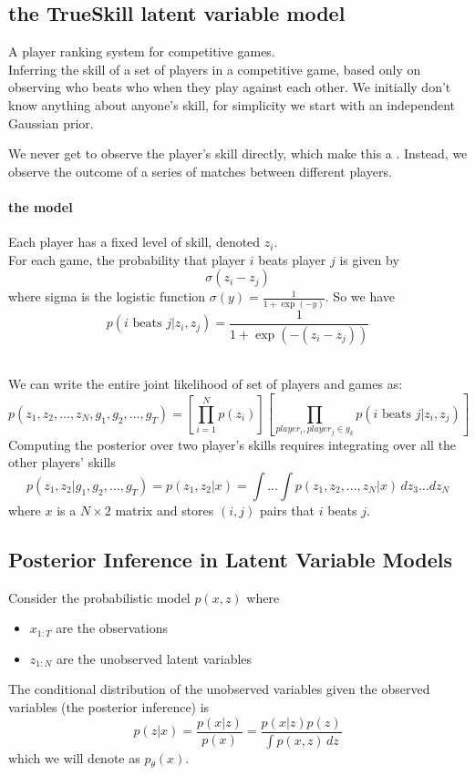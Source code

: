 \documentclass[11pt]{article}
\begin{document}
\subsection{the TrueSkill latent variable model}
A player ranking system for competitive games.\\
Inferring the skill of a set of players in a competitive game, based only on observing who beats who when they play against each other.  We initially don't know anything about anyone's skill, for simplicity we start with an independent Gaussian prior.

\remark
We never get to observe the player's skill directly, which make this a . Instead, we observe the outcome of a series of matches between different players.

\paragraph{the model}
Each player has a fixed level of skill, denoted $z_i$.\\
For each game, the probability that player $i$ beats player $j$ is given by
$$\sigma(z_i - z_j)$$
where sigma is the logistic function $\sigma(y) = \frac{1}{1 + \exp{(-y)}}$. So we have
$$p(i \text{ beats } j|z_i, z_j) = \frac{1}{1 + \exp{(-(z_i - z_j))}}$$

\remark
{}\\
We can write the entire joint likelihood of set of players and games as:
$$p(z_1, z_2, \hdots, z_N, g_1, g_2, \hdots, g_T) = \left[ \prod_{i=1}^N p(z_i)\right] \left[
 \prod_{player_i, player_j \in g_k} p( i \text{ beats }j |z_i, z_j)\right]$$
Computing the posterior over two player's skills requires integrating over all the other players' skills
$$p(z_1, z_2|g_1, g_2, \hdots,g_T) = p(z_1, z_2|x) = \int \hdots \int p(z_1, z_2, \hdots, z_N|x)\,dz_3 \hdots dz_N$$
where $x$ is a $N \times 2$ matrix and stores $(i, j)$ pairs that $i$ beats $j$.

\subsection{Posterior Inference in Latent Variable Models}
Consider the probabilistic model $p(x,z)$ where
\begin{itemize}
	\item $x_{1:T}$ are the observations
	\item $z_{1:N}$ are the unobserved latent variables
\end{itemize}
The conditional distribution of the unobserved variables given the observed variables (the posterior inference) is
$$p(z|x) = \frac{p(x|z)}{p(x)} = \frac{p(x|z)p(z)}{\int p(x,z)\,dz}$$
which we will denote as $p_\theta(x)$.\\
\end{document}
